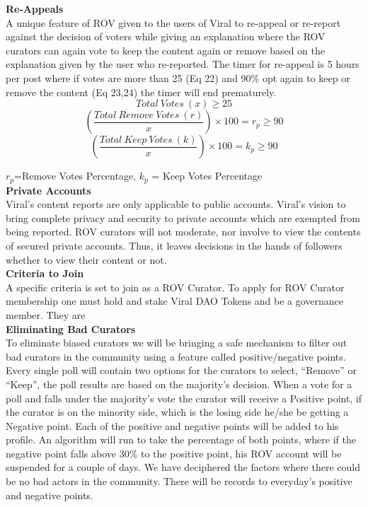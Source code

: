 \documentclass[10pt]{article}
\begin{document}
\textbf{Re-Appeals}\\

A unique feature of ROV given to the users of Viral to re-appeal or re-report against the decision of voters while giving an explanation where the ROV curators can again vote to keep the content again or remove based on the explanation given by the user who re-reported. The timer for re-appeal is 5 hours per post where if votes are more than 25 (Eq 22) and 90\% opt again to keep or remove the content (Eq 23,24) the timer will end prematurely.\\

\begin{equation}
Total\:Votes\:(x) \geq25
\end{equation}
\begin{equation}
(\frac{Total\:Remove\:Votes\:(r)}{x}) \times  100 = r_p \geq 90
\end{equation}
\begin{equation}
(\frac{Total\:Keep\:Votes\:(k)}{x}) \times  100 = k_p \geq 90
\end{equation}


$r_p$=Remove Votes Percentage, $k_p$ = Keep Votes Percentage\\

\textbf{Private Accounts}\\

Viral’s content reports are only applicable to public accounts. Viral’s vision to bring complete privacy and security to private accounts which are exempted from being reported. ROV curators will not moderate, nor involve to view the contents of secured private accounts. Thus, it leaves decisions in the hands of followers whether to view their content or not. \\

\textbf{Criteria to Join}\\

A specific criteria is set to join as a ROV Curator. To apply for ROV Curator membership one must hold and stake Viral DAO Tokens and be a governance member. They are \\

\textbf{Eliminating Bad Curators}\\

To eliminate biased curators we will be bringing a safe mechanism to filter out bad curators in the community using a feature called positive/negative points. Every single poll will contain two options for the curators to select, “Remove” or “Keep”, the poll results are based on the majority’s decision. When a vote for a poll and falls under the majority’s vote the curator will receive a Positive point, if the curator is on the minority side, which is the losing side he/she be getting a Negative point. Each of the positive and negative points will be added to his profile. An algorithm will run to take the percentage of both points, where if the negative point falls above 30\% to the positive point, his ROV account will be suspended for a couple of days. We have deciphered the factors where there could be no bad actors in the community. There will be records to everyday's positive and negative points. \\
\end{document}

